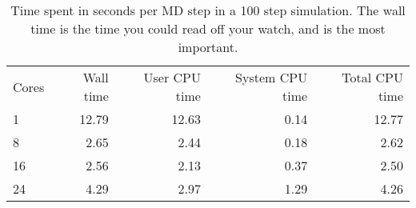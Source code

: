 \documentclass[11pt,bibliography=totoc,index=totoc]{scrbook}   %
\begin{document}
\begin{table}[htbp]
  \centering
  \begin{tabular}{lrrrr}
    Cores & Wall time & User CPU time & System CPU time & Total CPU time \\
    1     & 12.79 & 12.63 & 0.14 & 12.77 \\
    8     & 2.65 & 2.44 & 0.18 & 2.62 \\
    16    & 2.56 & 2.13 & 0.37 & 2.50 \\
    24    & 4.29 & 2.97 & 1.29 & 4.26 \\
  \end{tabular}
  \caption{Time spent in seconds per MD step in a 100 step simulation. The wall time is the time you could read off your watch, and is the most important.}
  \label{tab:}
\end{table}





\end{document}

